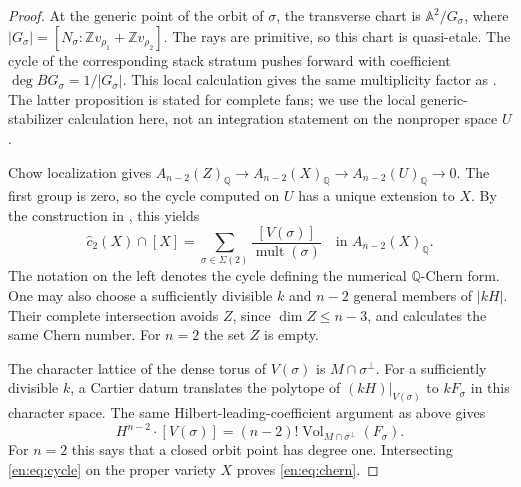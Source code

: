 \documentclass[12pt]{amsart}
\theoremstyle{definition}
\theoremstyle{remark}
\numberwithin{equation}{section}
\theoremstyle{plain}
\theoremstyle{definition}
\theoremstyle{remark}
\begin{document}
\begin{proof}
At the generic point of the orbit of $\sigma$, the transverse chart is
$\mathbb A^2/G_\sigma$, where
$|G_\sigma|=[N_\sigma:\mathbb Zv_{\rho_1}+\mathbb Zv_{\rho_2}]$.
The rays are primitive, so this chart is quasi-etale. The cycle of the corresponding stack stratum pushes forward with coefficient
$\deg BG_\sigma=1/|G_\sigma|$. This local calculation gives the same multiplicity factor as \cite[Definition~3.1 and Proposition~3.2]{en:EM}. The latter proposition is stated for complete fans; we use the local generic-stabilizer calculation here, not an integration statement on the nonproper space $U$.

Chow localization gives
$A_{n-2}(Z)_{\mathbb Q}\to A_{n-2}(X)_{\mathbb Q}
\to A_{n-2}(U)_{\mathbb Q}\to0$.
The first group is zero, so the cycle computed on $U$ has a unique extension to $X$. By the construction in \cite[\S3.10]{en:GKPT}, this yields
\begin{equation}\label{en:eq:cycle}
 \widehat c_2(X)\cap[X]
 =\sum_{\sigma\in\Sigma(2)}
     \frac{[V(\sigma)]}{\operatorname{mult}(\sigma)}
 \quad\text{in }A_{n-2}(X)_{\mathbb Q}.
\end{equation}
The notation on the left denotes the cycle defining the numerical
$\mathbb Q$-Chern form. One may also choose a sufficiently divisible $k$
and $n-2$ general members of $|kH|$. Their complete intersection avoids
$Z$, since $\dim Z\le n-3$, and calculates the same Chern number.
For $n=2$ the set $Z$ is empty.

The character lattice of the dense torus of $V(\sigma)$ is $M\cap\sigma^\perp$. For a sufficiently divisible $k$, a Cartier datum translates the polytope of
$(kH)|_{V(\sigma)}$ to $kF_\sigma$ in this character space. The same Hilbert-leading-coefficient argument as above gives
\begin{equation}\label{en:eq:orbit-degree}
 H^{n-2}\cdot[V(\sigma)]
 =(n-2)!\operatorname{Vol}_{M\cap\sigma^\perp}(F_\sigma).
\end{equation}
For $n=2$ this says that a closed orbit point has degree one. Intersecting
\eqref{en:eq:cycle} on the proper variety $X$ proves \eqref{en:eq:chern}.
\end{proof}
\end{document}
